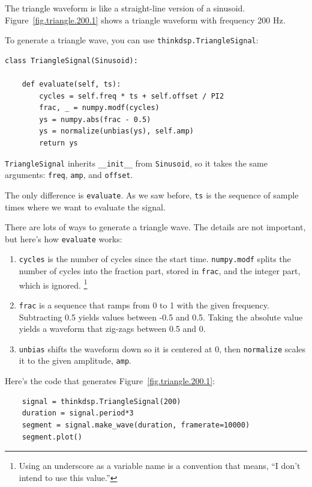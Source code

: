 \documentclass[12pt]{book}
\begin{document}
The triangle waveform is like a straight-line version of a sinusoid.
Figure~\ref{fig.triangle.200.1} shows a triangle waveform with
frequency 200 Hz.

To generate a triangle wave, you can use {\tt thinkdsp.TriangleSignal}:

\begin{verbatim}
class TriangleSignal(Sinusoid):
    
    def evaluate(self, ts):
        cycles = self.freq * ts + self.offset / PI2
        frac, _ = numpy.modf(cycles)
        ys = numpy.abs(frac - 0.5)
        ys = normalize(unbias(ys), self.amp)
        return ys
\end{verbatim}

{\tt TriangleSignal} inherits \verb"__init__" from {\tt Sinusoid},
so it takes the same arguments: {\tt freq}, {\tt amp}, and {\tt offset}.

The only difference is {\tt evaluate}.  As we saw before,
{\tt ts} is the sequence of sample times where we want to
evaluate the signal.

There are lots of ways to generate a triangle wave.  The details
are not important, but here's how {\tt evaluate} works:

\begin{enumerate}

\item {\tt cycles} is the number of cycles since the start time.
{\tt numpy.modf} splits the number of cycles into the fraction
part, stored in {\tt frac}, and the integer part, which is ignored.
\footnote{Using an underscore as a variable name is a convention that
means, ``I don't intend to use this value.''}

\item {\tt frac} is a sequence that ramps from 0 to 1 with the given
frequency.  Subtracting
0.5 yields values between -0.5 and 0.5.  Taking the absolute value
yields a waveform that zig-zags between 0.5 and 0.

\item {\tt unbias} shifts the waveform down so it is centered at 0, then
{\tt normalize} scales it to the given amplitude, {\tt amp}.

\end{enumerate}

Here's the code that generates Figure~\ref{fig.triangle.200.1}:

\begin{verbatim}
    signal = thinkdsp.TriangleSignal(200)
    duration = signal.period*3
    segment = signal.make_wave(duration, framerate=10000)
    segment.plot()
\end{verbatim}
\end{document}

